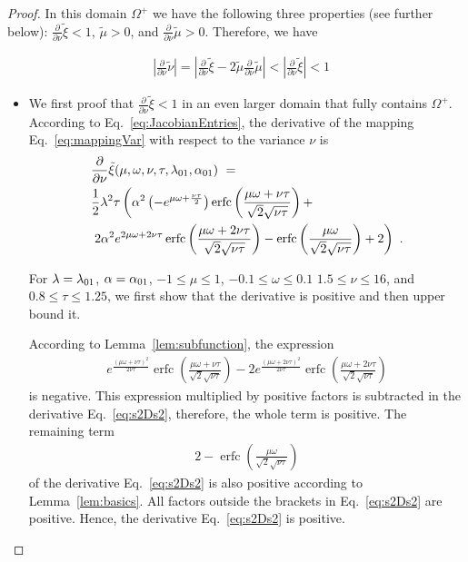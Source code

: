 \documentclass{article}
\newcommand\munn{{\tilde \mu}}
\newcommand\nunn{{\tilde \nu}}
\newcommand\xinn{{\tilde \xi}}
\renewcommand{\leq}{\leqslant}
\DeclareMathOperator{\erfc}{erfc}
\begin{document}
\begin{proof}
In this domain $\Omega^+$ we have the following three properties (see further below):
$\frac{\partial}{\partial \nu} \xinn < 1$, $\munn > 0$,
and $\frac{\partial}{\partial \nu} \munn > 0$. Therefore, we have

\begin{align}
 & \left| \frac{\partial}{\partial \nu} \nunn \right| = \left| \frac{\partial}{\partial \nu} \xinn- 2 \munn \frac{\partial}{\partial \nu} \munn \right| 
  < \left| \frac{\partial}{\partial \nu} \xinn \right| < 1 
\end{align}


\begin{itemize}
\item We first proof that $\frac{\partial}{\partial \nu} \xinn < 1$ in an even larger domain that fully contains $\Omega^+$.
According to  Eq.~\eqref{eq:JacobianEntries},
the derivative of the mapping  Eq.~\eqref{eq:mappingVar} 
with respect to the variance $\nu$ is
\begin{align}
\label{eq:s2Ds2}
&\frac{\partial}{\partial \nu} \xinn(\mu,\omega,\nu,\tau,\lambda_{\rm 01},\alpha_{\rm 01}) \ = \\ \nonumber 
&\frac{1}{2} \lambda ^2 \tau \left(\alpha ^2 \left(-e^{\mu \omega+\frac{\nu \tau}{2}}\right) \erfc
 \left(\frac{\mu \omega+\nu \tau}{\sqrt{2} \sqrt{\nu \tau}}\right)+\right. \\ \nonumber
&\left. 2 \alpha ^2 e^{2 \mu \omega+2 \nu \tau} \erfc \left(\frac{\mu \omega +2 \nu \tau}{\sqrt{2} \sqrt{\nu \tau}}\right)- 
   \erfc \left(\frac{\mu \omega}{\sqrt{2} \sqrt{\nu \tau}}\right)+2\right) \ .
\end{align}

For 
$\lambda=\lambda_{\rm 01}$, $\alpha=\alpha_{\rm 01}$, 
$-1 \leq \mu \leq 1$, 
$-0.1 \leq \omega \leq 0.1$ 
$1.5 \leq \nu \leq 16$, and 
$0.8 \leq \tau \leq 1.25$, we first show that the derivative is positive
and then upper bound it.

According to  Lemma~\ref{lem:subfunction}, the expression
\begin{align}
e^{\frac{(\mu \omega +\nu \tau)^2}{2 \nu \tau}} \erfc \left(\frac{\mu \omega+\nu \tau}{\sqrt{2} \sqrt{\nu \tau}}\right)- 
 2 e^{\frac{(\mu \omega +2 \nu \tau)^2}{2 \nu \tau}} \erfc\left(\frac{\mu \omega+2 \nu \tau}{\sqrt{2} \sqrt{\nu \tau}}\right) 
\end{align}
is negative. This expression multiplied by positive factors is
subtracted in the derivative Eq.~\eqref{eq:s2Ds2}, therefore, the
whole term is positive.
The remaining term
\begin{align}
2-\erfc\left(\frac{\mu \omega}{\sqrt{2} \sqrt{\nu \tau}}\right)
\end{align}
of the derivative Eq.~\eqref{eq:s2Ds2}
is also positive according to Lemma~\ref{lem:basics}.
All factors outside the brackets in  Eq.~\eqref{eq:s2Ds2} are
positive. Hence, the derivative Eq.~\eqref{eq:s2Ds2} is positive.



\end{itemize}
\end{proof}
\end{document}
